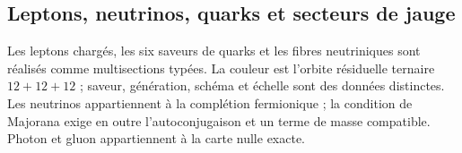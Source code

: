 \let\clearpage\relax

\endgroup
\begingroup
\let\chapter\section
\let\section\subsection
\let\subsection\subsubsection
\let\subsubsection\paragraph
\let\clearpage\relax

\endgroup

\section{Leptons, neutrinos, quarks et secteurs de jauge}
Les leptons chargés, les six saveurs de quarks et les fibres neutriniques sont réalisés comme multisections typées. La couleur est l’orbite résiduelle ternaire \(12+12+12\) ; saveur, génération, schéma et échelle sont des données distinctes. Les neutrinos appartiennent à la complétion fermionique ; la condition de Majorana exige en outre l’autoconjugaison et un terme de masse compatible. Photon et gluon appartiennent à la carte nulle exacte.

